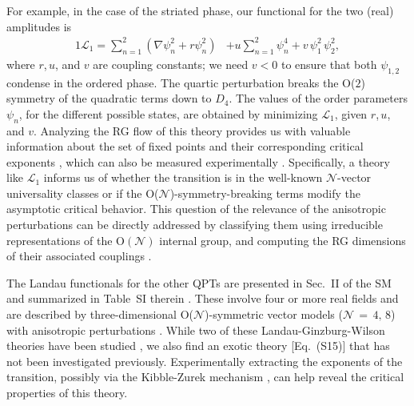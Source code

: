 \documentclass[prl,twocolumn,superscriptaddress,showpacs,amsmath,amstex,amssymb,citeautoscript]{revtex4-1}
\newcommand{\mc}{\mathcal}
\begin{document}
For example, in the case of the striated phase, our functional for the two (real) amplitudes is 
\begin{alignat}{1}
\label{eq:L1}
\mathcal{L}^{}_1 = \sum_{n=1}^2 \left(\nabla \psi_n^2 + r  \psi_n^2 \right)&+ u \sum_{n=1}^2  \psi_n ^4  + v\,  \psi_1^2\,  \psi_2^2,
\end{alignat}
where $r$,\,$u$, and $v$ are coupling constants; we need $v<0$ to ensure that both $\psi_{1,2}$ condense in the ordered phase. 
The quartic perturbation breaks the O($2$) symmetry of the quadratic terms down to $D_4$. The values of the order parameters $\psi_n$, for the different possible states, are obtained by minimizing $\mathcal{L}^{}_1$, given $r$,\,$u$, and $v$. Analyzing the RG flow of this theory provides us with valuable information about the set of fixed points and their corresponding critical exponents \cite{Pelissetto2000}, which can also be measured experimentally \cite{keesling2019quantum}. Specifically, a theory like $\mc{L}_1$ informs us of whether the transition is in the well-known $\mathscr{N}$-vector universality classes \cite{zinn1996quantum} or if the O($\mathscr{N}$)-symmetry-breaking terms modify the asymptotic critical behavior. This question of the relevance of the anisotropic perturbations can be directly addressed by classifying them \cite{Pelissetto2000, domb2001phase} using irreducible representations of the O$(\mathscr{N})$ internal group, and computing the RG dimensions of their associated couplings \cite{Vicari2011}. 

The Landau functionals for the other QPTs %
are presented in Sec.~II of the SM and summarized in Table~SI therein \cite{sm}. These involve four or more real fields and are described by three-dimensional O($\mathscr{N}$)-symmetric vector models ($\mathscr{N}$\,$=$\,$4,\,8$) \cite{stanley1968dependence} with anisotropic perturbations \cite{Vicari2011}. While two of these Landau-Ginzburg-Wilson theories have been studied \cite{Pelissetto2000,Calabrese2004}, we also find an exotic theory %
[Eq.~(S15)]
that has not been investigated previously. Experimentally extracting the exponents of the transition, possibly via the Kibble-Zurek mechanism \cite{kibble1976topology, kibble1980some, zurek1985cosmological, zurek1993cosmic, zurek1996cosmological}, can help reveal the critical properties of this theory.
\end{document}
